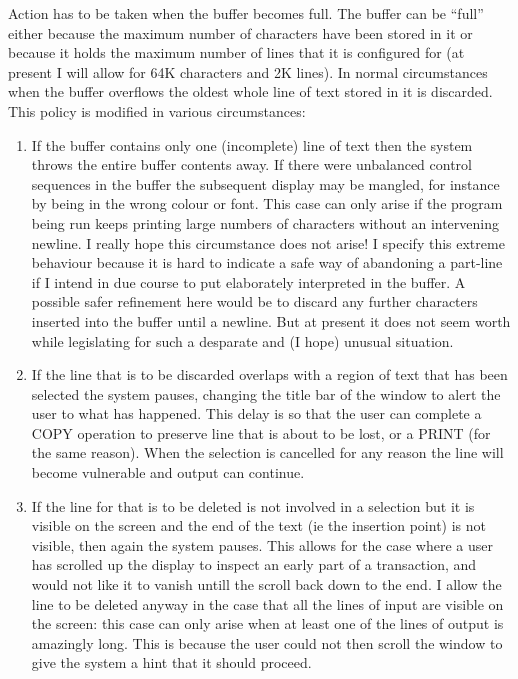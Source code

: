 \documentclass[a4paper,11pt]{article}
\begin{document}
Action has to be taken when the buffer becomes full. The buffer can be ``full''
either because the maximum number of characters have been stored in it or
because it holds the maximum number of lines that it is configured for
(at present I will allow for 64K characters and 2K lines).  In normal
circumstances when the buffer overflows the oldest whole line of text
stored in it is discarded. This policy is modified in various circumstances:
\begin{enumerate}
\item If the buffer contains only one (incomplete) line of text then the 
    system throws the entire buffer contents away. If there were unbalanced
    control sequences in the buffer the subsequent display may be mangled,
    for instance by being in the wrong colour or font. 
    This case can only arise if the program being run keeps
    printing large numbers of characters without an intervening newline.
    I really hope this circumstance does not arise! I specify this extreme
    behaviour because it is hard to indicate a safe way of abandoning a
    part-line if I intend in due course to put elaborately interpreted
    in the buffer. A possible safer refinement here would be to discard any
    further characters inserted into the buffer until a newline. But at
    present it does not seem worth while legislating for such a desparate
    and (I hope) unusual situation.
\item If the line that is to be discarded overlaps with a region of text that
    has been selected the system pauses, changing the title bar of the window
    to alert the user to what has happened. This delay is so that the user can
    complete a COPY operation to preserve line that is about to be lost, or
    a PRINT (for the same reason).  When the selection is cancelled for any
    reason the line will become vulnerable and output can continue.
\item If the line for that is to be deleted is not involved in a selection
    but it is visible on the screen and the end of the text (ie the insertion
    point) is not visible, then again the system pauses. This allows for the
    case where a user has scrolled up the display to inspect an early part of
    a transaction, and would not like it to vanish untill the scroll back down
    to the end.  I allow the line to be deleted anyway in the case that all
    the lines of input are visible on the screen: this case can only arise
    when at least one of the lines of output is amazingly long. This is
    because the user could not then scroll the window to give the system a
    hint that it should proceed.
\end{enumerate}
\end{document}
